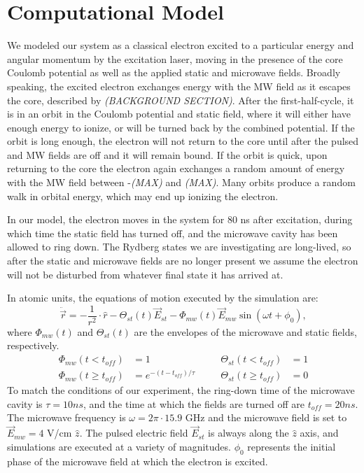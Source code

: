 \documentclass[aps,pra,preprint,groupedaddress]{revtex4-1}
\begin{document}
\section{Computational Model}
\label{sec:comp}

We modeled our system as a classical electron excited to a particular energy and angular momentum by the excitation laser, moving in the presence of the core Coulomb potential as well as the applied static and microwave fields. Broadly speaking, the excited electron exchanges energy with the MW field as it escapes the core, described by \emph{(BACKGROUND SECTION)}. After the first-half-cycle, it is in an orbit in the Coulomb potential and static field, where it will either have enough energy to ionize, or will be turned back by the combined potential. If the orbit is long enough, the electron will not return to the core until after the pulsed and MW fields are off and it will remain bound. If the orbit is quick, upon returning to the core the electron again exchanges a random amount of energy with the MW field between -\emph{(MAX)} and \emph{(MAX)}. Many orbits produce a random walk in orbital energy, which may end up ionizing the electron.

In our model, the electron moves in the system for 80 ns after excitation, during which time the static field has turned off, and the microwave cavity has been allowed to ring down. The Rydberg states we are investigating are long-lived, so after the static and microwave fields are no longer present we assume the electron will not be disturbed from whatever final state it has arrived at.

In atomic units, the equations of motion executed by the simulation are:
\begin{equation}
\ddot{\vec{r}} = -\frac{1}{r^2} \cdot \hat{r} - \Theta_{st}(t) \vec{E}_{st} - \Phi_{mw}(t) \vec{E}_{mw} \sin{(\omega t + \phi_0)},
\end{equation}
where $\Phi_{mw}(t)$ and $\Theta_{st}(t)$ are the envelopes of the microwave and static fields, respectively.
\begin{align}
\Phi_{mw}(t<t_{off}) & = 1 & \quad & \Theta_{st}(t<t_{off}) & = 1 \\
\Phi_{mw}(t \geq t_{off}) & = e^{-(t-t_{off})/\tau} & \quad & \Theta_{st}(t \geq t_{off}) & = 0
\end{align}
To match the conditions of our experiment, the ring-down time of the microwave cavity is $\tau = 10 ns$, and the time at which the fields are turned off are $t_{off} = 20 ns$. The microwave frequency is $\omega = 2\pi \cdot 15.9$ GHz and the microwave field is set to $\vec{E}_{mw} = 4$ V/cm $\hat{z}$. The pulsed electric field $\vec{E}_{st}$ is always along the $\hat{z}$ axis, and simulations are executed at a variety of magnitudes. $\phi_0$ represents the initial phase of the microwave field at which the electron is excited.
\end{document}
